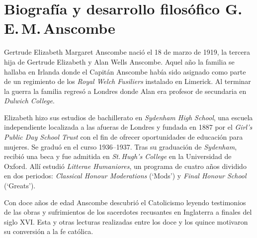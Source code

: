 \section{Biografía y desarrollo filosófico G.\,E.\,M.\,Anscombe}

Gertrude Elizabeth Margaret Anscombe nació el 18 de marzo de 1919, la tercera hija de Gertrude Elizabeth y Alan Wells Anscombe. Aquel año la familia se hallaba en Irlanda donde el Capitán Anscombe había sido asignado como parte de un regimiento de los \emph{Royal Welch Fusiliers} instalado en Limerick. Al terminar la guerra la familia regresó a Londres donde Alan era profesor de secundaria en \emph{Dulwich College}.\autocite[Cf.~][31]{teichman2002fellows}

Elizabeth hizo sus estudios de bachillerato en \emph{Sydenham High School}, una escuela independiente localizada a las afueras de Londres y fundada en 1887 por el \emph{Girl's Public Day School Trust} con el fin de ofrecer oportunidades de educación para mujeres. Se graduó en el curso 1936--1937. Tras su graduación de \emph{Sydenham}, recibió una beca y fue admitida en \emph{St.\,Hugh's College} en la Universidad de Oxford. Allí estudió \emph{Litterae Humaniores}, un programa de cuatro años dividido en dos periodos: \emph{Classical Honour Moderations} (`Mods') y \emph{Final Honour School} (`Greats').

Con doce años de edad Anscombe descubrió el Catolicismo leyendo testimonios de las obras y sufrimientos de los sacerdotes recusantes en Inglaterra a finales del siglo XVI. Esta y otras lecturas realizadas entre los doce y los quince motivaron su conversión a la fe católica.\autocite[Cf.~][33]{teichman2002fellows}

